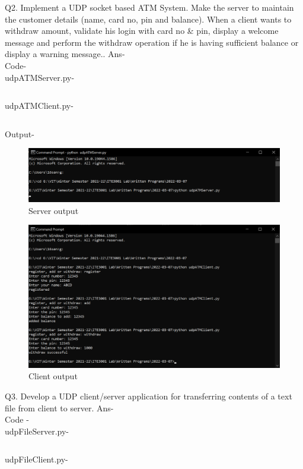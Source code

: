 \documentclass[12pt]{article}
\begin{document}
Q2. Implement a UDP socket based ATM System. Make the server to maintain the customer details (name, card no, pin and balance). When a client wants to withdraw amount, validate his login with card no & pin, display a welcome message and perform the withdraw operation if he is having sufficient balance or display a warning message.. \newline
Ans- \\ Code- \\ udpATMServer.py-\inputminted{python}{udpATMServer.py}
udpATMClient.py- \inputminted{python}{udpATMClient.py}
Output-
\begin{figure}[h] %
\centering
\includegraphics[width=\textwidth]{udpATMServer.png}
\caption{Server output}
\end{figure}
\begin{figure}[h] %
\centering
\includegraphics[width=\textwidth]{udpATMClient.png}
\caption{Client output}
\end{figure}
\newpage
Q3. Develop a UDP client/server application for transferring contents of a text file from client to server.
Ans- \\ Code - \\ udpFileServer.py-\inputminted{python}{udpFileServer.py}
udpFileClient.py- \inputminted{python}{udpFileClient.py}
\end{document}
